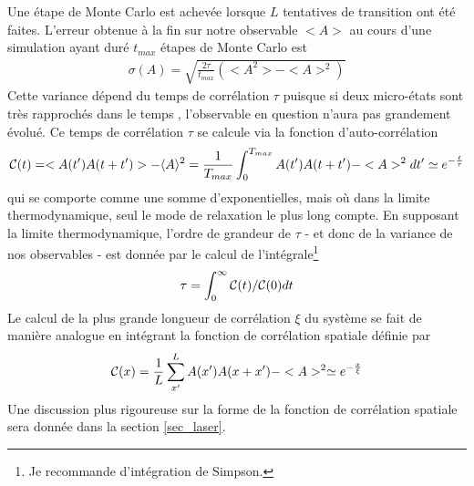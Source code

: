 Une étape de Monte Carlo est achevée lorsque $L$ tentatives de transition ont été faites. L'erreur obtenue à la fin sur notre observable $<A>$ au cours d'une simulation ayant duré $t_{max}$ étapes de Monte Carlo est 
\begin{align}
	\sigma(A) = \sqrt{\frac{2 \tau}{t_{max}} (<A^2>-<A>^2)} 
\end{align}
Cette variance dépend du temps de corrélation $\tau$ puisque si deux micro-états sont très rapprochés dans le temps , l'observable en question n'aura pas grandement évolué. Ce temps de corrélation $\tau$ se calcule via la fonction d'auto-corrélation 
\begin{align}
\mathcal{C}(t) = <A(t')A(t+t')>-\langle A \rangle^2 = \frac{1}{T_{max}}\int_0^{T_{max}}A(t')A(t+t')-<A>^2 dt' \simeq e^{-\frac{t}{\tau}}
\end{align}
qui se comporte comme une somme d'exponentielles, mais où dans la limite thermodynamique, seul le mode de relaxation le plus long compte\cite{wansleben_monte_1991}. En supposant la limite thermodynamique, l'ordre de grandeur de $\tau$ - et donc de la variance de nos observables - est donnée par le calcul de l'intégrale\footnote{Je recommande d'intégration de Simpson.}
\begin{align}
	\tau = \int_0^{\infty} \mathcal{C}(t)/\mathcal{C}(0) dt
	\label{tau_cor}
\end{align}
Le calcul de la plus grande longueur de corrélation $\xi$ du système se fait de manière analogue en intégrant la fonction de corrélation spatiale définie par
\begin{align}
\mathcal{C}(x) = \frac{1}{L} \sum_{x'}^L A(x')A(x+x')-<A>^2 \simeq e^{-\frac{x}{\xi}}
\end{align}
Une discussion plus rigoureuse sur la forme de la fonction de corrélation spatiale sera donnée dans la section \ref{sec_laser}.

